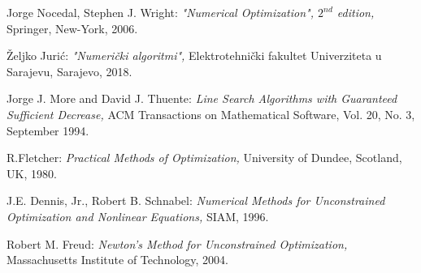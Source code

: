 \documentclass[bosnian,12pt,a4paper]{report}
\begin{document}
	\begin{thebibliography}{}
	Jorge Nocedal, Stephen J. Wright:
	\textit{"Numerical Optimization", $2^{nd}$ edition,}
	Springer, New-York, 2006.
	
	Željko Jurić:
	\textit{"Numerički algoritmi",}
	Elektrotehnički fakultet Univerziteta u Sarajevu, Sarajevo, 2018.
	
	
	Jorge J. More and David J. Thuente:
	\textit{Line Search Algorithms with Guaranteed Sufficient Decrease,} ACM Transactions on Mathematical Software, Vol. 20, No. 3, September 1994.
	
	R.Fletcher:
	\textit{Practical Methods of Optimization,}
	University of Dundee, Scotland, UK, 1980.
	
	J.E. Dennis, Jr., Robert B. Schnabel:
	\textit{Numerical Methods for Unconstrained Optimization and Nonlinear Equations,}
	SIAM, 1996.
	
	Robert M. Freud:
	\textit{Newton’s Method for Unconstrained Optimization,}
	Massachusetts Institute of Technology, 2004.
\end{thebibliography}
\end{document}
